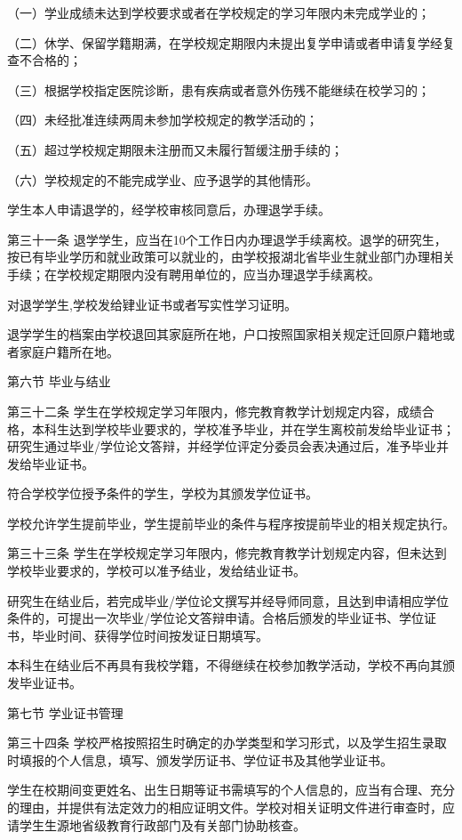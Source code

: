 \documentclass[UTF8,12pt,a4paper]{report}
\begin{document}
（一）学业成绩未达到学校要求或者在学校规定的学习年限内未完成学业的；

（二）休学、保留学籍期满，在学校规定期限内未提出复学申请或者申请复学经复查不合格的；

（三）根据学校指定医院诊断，患有疾病或者意外伤残不能继续在校学习的；

（四）未经批准连续两周未参加学校规定的教学活动的；

（五）超过学校规定期限未注册而又未履行暂缓注册手续的；

（六）学校规定的不能完成学业、应予退学的其他情形。

学生本人申请退学的，经学校审核同意后，办理退学手续。

第三十一条 退学学生，应当在10个工作日内办理退学手续离校。退学的研究生，按已有毕业学历和就业政策可以就业的，由学校报湖北省毕业生就业部门办理相关手续；在学校规定期限内没有聘用单位的，应当办理退学手续离校。

对退学学生,学校发给肄业证书或者写实性学习证明。

退学学生的档案由学校退回其家庭所在地，户口按照国家相关规定迁回原户籍地或者家庭户籍所在地。

第六节 毕业与结业

第三十二条 学生在学校规定学习年限内，修完教育教学计划规定内容，成绩合格，本科生达到学校毕业要求的，学校准予毕业，并在学生离校前发给毕业证书；研究生通过毕业/学位论文答辩，并经学位评定分委员会表决通过后，准予毕业并发给毕业证书。

符合学校学位授予条件的学生，学校为其颁发学位证书。

学校允许学生提前毕业，学生提前毕业的条件与程序按提前毕业的相关规定执行。

第三十三条 学生在学校规定学习年限内，修完教育教学计划规定内容，但未达到学校毕业要求的，学校可以准予结业，发给结业证书。

研究生在结业后，若完成毕业/学位论文撰写并经导师同意，且达到申请相应学位条件的，可提出一次毕业/学位论文答辩申请。合格后颁发的毕业证书、学位证书，毕业时间、获得学位时间按发证日期填写。

本科生在结业后不再具有我校学籍，不得继续在校参加教学活动，学校不再向其颁发毕业证书。

第七节 学业证书管理

第三十四条 学校严格按照招生时确定的办学类型和学习形式，以及学生招生录取时填报的个人信息，填写、颁发学历证书、学位证书及其他学业证书。

学生在校期间变更姓名、出生日期等证书需填写的个人信息的，应当有合理、充分的理由，并提供有法定效力的相应证明文件。学校对相关证明文件进行审查时，应请学生生源地省级教育行政部门及有关部门协助核查。
\end{document}
